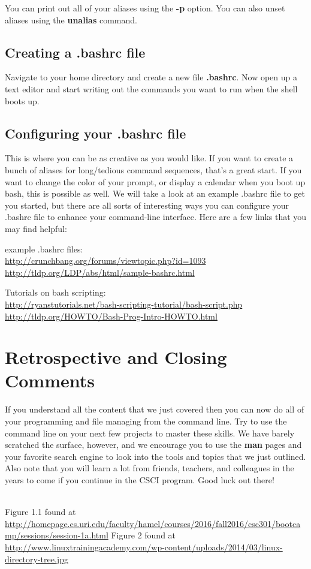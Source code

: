 \documentclass[oneside]{book}
\begin{document}
You can print out all of your aliases using the \textbf{-p} option. You can also unset aliases using the \textbf{unalias} command. 

\subsection{Creating a .bashrc file}
Navigate to your home directory and create a new file \textbf{.bashrc}. Now open up a text editor and start writing out the commands you want to run when the shell boots up.

\subsection{Configuring your .bashrc file}
This is where you can be as creative as you would like. If you want to create a bunch of aliases for long/tedious command sequences, that's a great start. If you want to change the color of your prompt, or display a calendar when you boot up bash, this is possible as well. We will take a look at an example .bashrc file to get you started, but there are all sorts of interesting ways you can configure your .bashrc file to enhance your command-line interface. Here are a few links that you may find helpful:

example .bashrc files:\\ \url{http://crunchbang.org/forums/viewtopic.php?id=1093}\\ 
\url{http://tldp.org/LDP/abs/html/sample-bashrc.html}


Tutorials on bash scripting:\\ \url{http://ryanstutorials.net/bash-scripting-tutorial/bash-script.php}\\
\url{http://tldp.org/HOWTO/Bash-Prog-Intro-HOWTO.html}






\newpage

\section{Retrospective and Closing Comments}
    If you understand all the content that we just covered then you can now do all of your programming and file managing from the command line. Try to use the command line on your next few projects to master these skills. We have barely scratched the surface, however, and we encourage you to use the \textbf{man} pages and your favorite search engine to look into the tools and topics that we just outlined. Also note that you will learn a lot from friends, teachers, and colleagues in the years to come if you continue in the CSCI program. Good luck out there!
    \\
    \\

\newpage
\begin{thebibliography}{10}
	 Figure 1.1 found at \url{http://homepage.cs.uri.edu/faculty/hamel/courses/2016/fall2016/csc301/bootcamp/sessions/session-1a.html}
	 Figure 2 found at \url{http://www.linuxtrainingacademy.com/wp-content/uploads/2014/03/linux-directory-tree.jpg}
\end{thebibliography}
\end{document}
